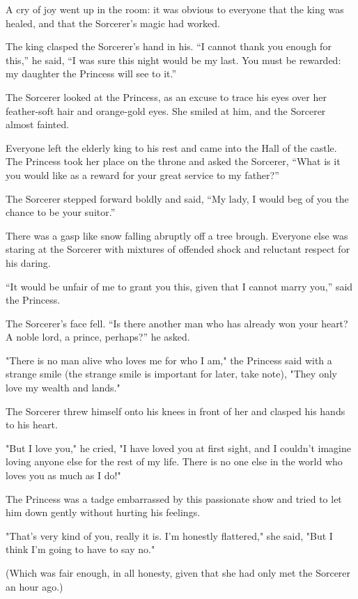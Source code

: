 A cry of joy went up in the room: it was obvious to everyone that the king was healed, and that the Sorcerer’s magic had worked. 

The king clasped the Sorcerer’s hand in his. “I cannot thank you enough for this,” he said, “I was sure this night would be my last. You must be rewarded: my daughter the Princess will see to it.” 

The Sorcerer looked at the Princess, as an excuse to trace his eyes over her feather-soft hair and orange-gold eyes. She smiled at him, and the Sorcerer almost fainted. 

Everyone left the elderly king to his rest and came into the Hall of the castle. The Princess took her place on the throne and asked the Sorcerer, “What is it you would like as a reward for your great service to my father?”

The Sorcerer stepped forward boldly and said, “My lady, I would beg of you the chance to be your suitor.”

There was a gasp like snow falling abruptly off a tree brough. Everyone else was staring at the Sorcerer with mixtures of offended shock and reluctant respect for his daring. 

“It would be unfair of me to grant you this, given that I cannot marry you,” said the Princess. 

The Sorcerer’s face fell. “Is there another man who has already won your heart? A noble lord, a prince, perhaps?” he asked.
 
"There is no man alive who loves me for who I am," the Princess said with a strange smile (the strange smile is important for later, take note), "They only love my wealth and lands." 

The Sorcerer threw himself onto his knees in front of her and clasped his hands to his heart. 

"But I love you," he cried, "I have loved you at first sight, and I couldn't imagine loving anyone else for the rest of my life. There is no one else in the world who loves you as much as I do!"

The Princess was a tadge embarrassed by this passionate show and tried to let him down gently without hurting his feelings. 

"That's very kind of you, really it is. I'm honestly flattered," she said, "But I think I'm going to have to say no." 

(Which was fair enough, in all honesty, given that she had only met the Sorcerer an hour ago.)


